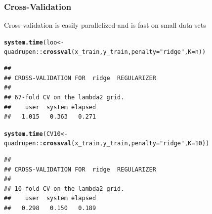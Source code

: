 \documentclass{beamer}\usepackage[]{graphicx}\usepackage[]{color}
\makeatletter
\newcommand{\hlnum}[1]{\textcolor[rgb]{0.686,0.059,0.569}{#1}}%
\newcommand{\hlstr}[1]{\textcolor[rgb]{0.192,0.494,0.8}{#1}}%
\newcommand{\hlopt}[1]{\textcolor[rgb]{0,0,0}{#1}}%
\newcommand{\hlstd}[1]{\textcolor[rgb]{0.345,0.345,0.345}{#1}}%
\newcommand{\hlkwb}[1]{\textcolor[rgb]{0.69,0.353,0.396}{#1}}%
\newcommand{\hlkwc}[1]{\textcolor[rgb]{0.333,0.667,0.333}{#1}}%
\newcommand{\hlkwd}[1]{\textcolor[rgb]{0.737,0.353,0.396}{\textbf{#1}}}%
\newenvironment{kframe}{%
 \def\at@end@of@kframe{}%
 \ifinner\ifhmode%
  \def\at@end@of@kframe{\end{minipage}}%
  \begin{minipage}{\columnwidth}%
 \fi\fi%
 \def\FrameCommand##1{\hskip\@totalleftmargin \hskip-\fboxsep
 \colorbox{shadecolor}{##1}\hskip-\fboxsep
     \hskip-\linewidth \hskip-\@totalleftmargin \hskip\columnwidth}%
 \MakeFramed {\advance\hsize-\width
   \@totalleftmargin\z@ \linewidth\hsize
   \@setminipage}}%
 {\par\unskip\endMakeFramed%
 \at@end@of@kframe}
\newenvironment{knitrout}{}{} %
\makeatother
\begin{document}
\begin{frame}[containsverbatim]
  \frametitle{Cross-Validation}
  
  Cross-validation is easily parallelized and is fast on small data sets

\begin{knitrout}\scriptsize
{}\color{fgcolor}\begin{kframe}
\begin{alltt}
\hlkwd{system.time}\hlstd{(loo} \hlkwb{<-} \hlstd{quadrupen}\hlopt{::}\hlkwd{crossval}\hlstd{(x_train,y_train,} \hlkwc{penalty} \hlstd{=}  \hlstr{"ridge"}\hlstd{,} \hlkwc{K} \hlstd{= n))}
\end{alltt}
\begin{verbatim}
## 
## CROSS-VALIDATION FOR  ridge  REGULARIZER 
## 
## 67-fold CV on the lambda2 grid.
##    user  system elapsed 
##   1.015   0.363   0.271
\end{verbatim}
\end{kframe}
\end{knitrout}

\begin{knitrout}\scriptsize
{}\color{fgcolor}\begin{kframe}
\begin{alltt}
\hlkwd{system.time}\hlstd{(CV10} \hlkwb{<-} \hlstd{quadrupen}\hlopt{::}\hlkwd{crossval}\hlstd{(x_train,y_train,} \hlkwc{penalty} \hlstd{=}  \hlstr{"ridge"}\hlstd{,} \hlkwc{K} \hlstd{=} \hlnum{10}\hlstd{))}
\end{alltt}
\begin{verbatim}
## 
## CROSS-VALIDATION FOR  ridge  REGULARIZER 
## 
## 10-fold CV on the lambda2 grid.
##    user  system elapsed 
##   0.298   0.150   0.189
\end{verbatim}
\end{kframe}
\end{knitrout}

\end{frame}
\end{document}
